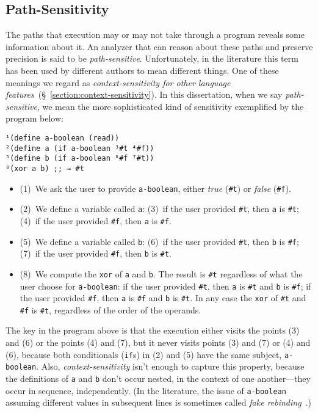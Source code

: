 \documentclass[12pt, oneside]{book}
\begin{document}
\subsection{Path-Sensitivity}
\label{section:path-sensitivity}

The paths that execution may or may not take through a program reveals some information about it. An analyzer that can reason about these paths and preserve precision is said to be \emph{path-sensitive}. Unfortunately, in the literature this term has been used by different authors to mean different things. One of these meanings we regard as \emph{context-sensitivity for other language features}~(§~\ref{section:context-sensitivity}). In this dissertation, when we say \emph{path-sensitive}, we mean the more sophisticated kind of sensitivity exemplified by the program below:

\begin{Verbatim}
¹(define a-boolean (read))
²(define a (if a-boolean ³#t ⁴#f))
⁵(define b (if a-boolean ⁶#f ⁷#t))
⁸(xor a b) ;; ⇒ #t
\end{Verbatim}

\begin{itemize}
  \item (1)~We ask the user to provide \texttt{a-boolean}, either \emph{true} (\texttt{\#t}) or \emph{false} (\texttt{\#f}).
  \item (2)~We define a variable called \texttt{a}: (3)~if the user provided \texttt{\#t}, then \texttt{a} is \texttt{\#t}; (4)~if the user provided \texttt{\#f}, then \texttt{a} is \texttt{\#f}.
  \item (5)~We define a variable called \texttt{b}: (6)~if the user provided \texttt{\#t}, then \texttt{b} is \texttt{\#f}; (7)~if the user provided \texttt{\#f}, then \texttt{b} is \texttt{\#t}.
  \item (8)~We compute the \texttt{xor} of \texttt{a} and \texttt{b}. The result is \texttt{\#t} regardless of what the user choose for \texttt{a-boolean}: if the user provided \texttt{\#t}, then \texttt{a} is \texttt{\#t} and \texttt{b} is \texttt{\#f}; if the user provided \texttt{\#f}, then \texttt{a} is \texttt{\#f} and \texttt{b} is \texttt{\#t}. In any case the \texttt{xor} of \texttt{\#t} and \texttt{\#f} is \texttt{\#t}, regardless of the order of the operands.
\end{itemize}

The key in the program above is that the execution either visits the points (3) and (6) or the points (4) and (7), but it never visits points (3) and (7) or (4) and (6), because both conditionals (\texttt{if}s) in (2) and (5) have the same subject, \texttt{a-boolean}. Also, \emph{context-sensitivity} isn’t enough to capture this property, because the definitions of \texttt{a} and \texttt{b} don’t occur nested, in the context of one another—they occur in sequence, independently. (In the literature, the issue of \texttt{a-boolean} assuming different values in subsequent lines is sometimes called \emph{fake rebinding}~\cite[§~3.3.4]{cfa2}.)
\end{document}
